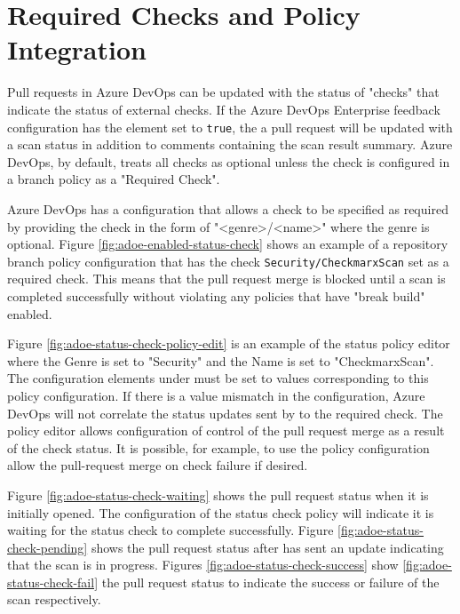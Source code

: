 \section{Required Checks and \cxone Policy Integration}

Pull requests in Azure DevOps can be updated with the status of "checks" that indicate the status
of external checks.  If the Azure DevOps Enterprise feedback configuration has the
 element set to \texttt{true},
the a pull request will be updated with a scan status in addition to comments containing
the scan result summary.  Azure DevOps, by default, treats all checks as optional unless
the check is configured in a branch policy as a "Required Check".

Azure DevOps has a 
configuration that allows a check to be specified as required by providing the check in the form of "<genre>/<name>" where the
genre is optional.  Figure \ref{fig:adoe-enabled-status-check} shows an example of a repository
branch policy configuration that has the check \texttt{Security/CheckmarxScan} set as a required check.
This means that the pull request merge is blocked until a scan is completed successfully without
violating any \cxone policies that have "break build" enabled.

Figure \ref{fig:adoe-status-check-policy-edit} is an example of the status policy editor where
the Genre is set to "Security" and the Name is set to "CheckmarxScan".  The configuration elements under
 must be set to values corresponding to this
policy configuration.  If there is a value mismatch in the \cxoneflow configuration, Azure DevOps
will not correlate the status updates sent by \cxoneflow to the required check.  The policy
editor allows configuration of control of the pull request merge as a result of the check
status.  It is possible, for example, to use the policy configuration allow the
pull-request merge on check failure if desired.

Figure \ref{fig:adoe-status-check-waiting} shows the pull request status when it is initially
opened.  The configuration of the status check policy will indicate it is waiting for the
status check to complete successfully. Figure \ref{fig:adoe-status-check-pending} shows
the pull request status after \cxoneflow has sent an update indicating that the scan
is in progress.  Figures \ref{fig:adoe-status-check-success} show \ref{fig:adoe-status-check-fail}
the pull request status to indicate the success or failure of the scan respectively.

